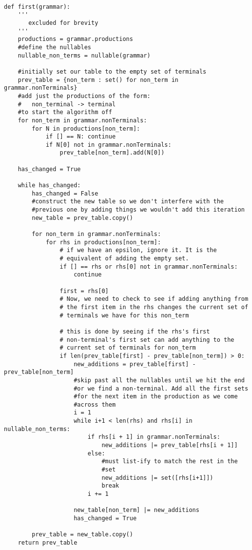 \documentclass{article}
\begin{document}
\begin{verbatim}

def first(grammar):
    '''
       excluded for brevity
    '''
    productions = grammar.productions
    #define the nullables
    nullable_non_terms = nullable(grammar)
    
    #initially set our table to the empty set of terminals
    prev_table = {non_term : set() for non_term in grammar.nonTerminals}
    #add just the productions of the form: 
    #   non_terminal -> terminal
    #to start the algorithm off
    for non_term in grammar.nonTerminals:
        for N in productions[non_term]:
            if [] == N: continue
            if N[0] not in grammar.nonTerminals:
                prev_table[non_term].add(N[0])

    has_changed = True

    while has_changed:
        has_changed = False
        #construct the new table so we don't interfere with the
        #previous one by adding things we wouldn't add this iteration
        new_table = prev_table.copy()

        for non_term in grammar.nonTerminals:
            for rhs in productions[non_term]:
                # if we have an epsilon, ignore it. It is the
                # equivalent of adding the empty set.
                if [] == rhs or rhs[0] not in grammar.nonTerminals:
                    continue

                first = rhs[0]
                # Now, we need to check to see if adding anything from
                # the first item in the rhs changes the current set of
                # terminals we have for this non_term

                # this is done by seeing if the rhs's first
                # non-terminal's first set can add anything to the
                # current set of terminals for non_term
                if len(prev_table[first] - prev_table[non_term]) > 0:
                    new_additions = prev_table[first] - prev_table[non_term]
                    #skip past all the nullables until we hit the end
                    #or we find a non-terminal. Add all the first sets
                    #for the next item in the production as we come
                    #across them
                    i = 1
                    while i+1 < len(rhs) and rhs[i] in nullable_non_terms:
                        if rhs[i + 1] in grammar.nonTerminals:
                            new_additions |= prev_table[rhs[i + 1]]
                        else:
                            #must list-ify to match the rest in the
                            #set
                            new_additions |= set([rhs[i+1]])
                            break
                        i += 1

                    new_table[non_term] |= new_additions
                    has_changed = True

        prev_table = new_table.copy()
    return prev_table
\end{verbatim}
\label{exerpt:first}
\end{document}
